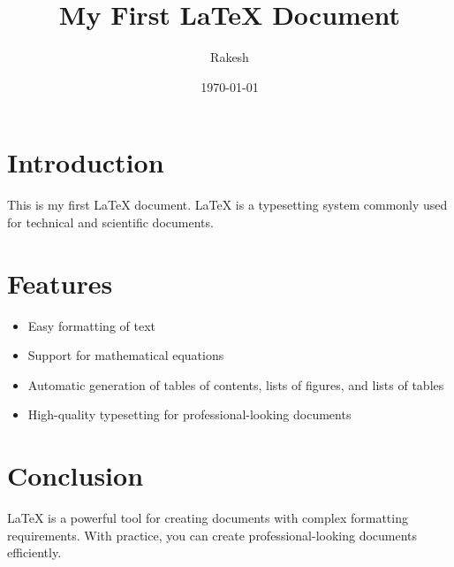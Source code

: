 \documentclass{article} %
\title{My First LaTeX Document}
\author{Rakesh}
\date{\today}
\begin{document}
	\maketitle
	\section{Introduction}
	This is my first LaTeX document. LaTeX is a typesetting system commonly
	used for technical and scientific documents.
	\section{Features}
	\begin{itemize}
		\item Easy formatting of text
		\item Support for mathematical equations
		\item Automatic generation of tables of contents, lists of figures, and lists of
		tables
		\item High-quality typesetting for professional-looking documents
	\end{itemize}
	\section{Conclusion}
	LaTeX is a powerful tool for creating documents with complex formatting
	requirements. With practice, you can create professional-looking documents
	efficiently.
\end{document}
